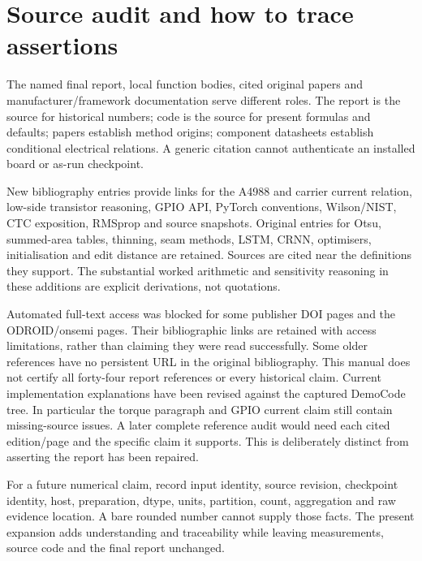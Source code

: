 \section{Source audit and how to trace assertions}
\label{sec:source-audit}
The named final report, local function bodies, cited original papers and
manufacturer/framework documentation serve different roles. The report is
the source for historical numbers; code is the source for present formulas
and defaults; papers establish method origins; component datasheets establish
conditional electrical relations. A generic citation cannot authenticate an
installed board or as-run checkpoint.

New bibliography entries provide links for the A4988 and carrier current
relation, low-side transistor reasoning, GPIO API, PyTorch conventions,
Wilson/NIST, CTC exposition, RMSprop and source snapshots. Original entries
for Otsu, summed-area tables, thinning, seam methods, LSTM, CRNN, optimisers,
initialisation and edit distance are retained. Sources are cited near the
definitions they support. The substantial worked arithmetic and sensitivity
reasoning in these additions are explicit derivations, not quotations.

Automated full-text access was blocked for some publisher DOI pages and
the ODROID/onsemi pages. Their bibliographic links are retained with access
limitations, rather than claiming they were read successfully. Some older
references have no persistent URL in the original bibliography. This manual
does not certify all forty-four report references or every historical claim.
Current implementation explanations have been revised against the captured DemoCode tree. In particular the torque paragraph and GPIO
current claim still contain missing-source issues. A later complete reference
audit would need each cited edition/page and the specific claim it supports.
This is deliberately distinct from asserting the report has been repaired.

For a future numerical claim, record input identity, source revision,
checkpoint identity, host, preparation, dtype, units, partition, count,
aggregation and raw evidence location. A bare rounded number cannot supply
those facts. The present expansion adds understanding and traceability while
leaving measurements, source code and the final report unchanged.

